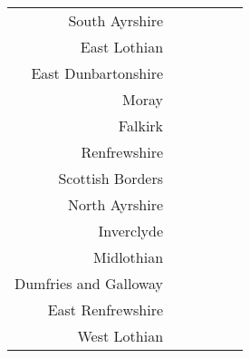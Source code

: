\documentclass[
  12pt,
]{article}
\begin{document}
\begin{longtable}[t]{rrrrrr}
South Ayrshire & \cellcolor{white}{  59.5\%} & \cellcolor{white}{  65.3\%} & \cellcolor{white}{  50.0\%} & \cellcolor{white}{  58.0\%} & \cellcolor{white}{ 116.8\%}\\
East Lothian & \cellcolor{white}{ 202.4\%} & \cellcolor{white}{ 101.1\%} & \cellcolor{white}{ 100.2\%} & \cellcolor{white}{  95.8\%} & \cellcolor{white}{  84.7\%}\\
East Dunbartonshire & \cellcolor{white}{ 185.3\%} & \cellcolor{white}{ 158.8\%} & \cellcolor{white}{  86.7\%} & \cellcolor{white}{  69.6\%} & \cellcolor{white}{ 192.3\%}\\
Moray & \cellcolor{white}{  52.5\%} & \cellcolor{white}{  64.2\%} & \cellcolor{white}{  40.1\%} & \cellcolor{white}{  54.0\%} & \cellcolor{white}{ 452.5\%}\\
Falkirk & \cellcolor{white}{  69.3\%} & \cellcolor{white}{  66.9\%} & \cellcolor{white}{  61.2\%} & \cellcolor{white}{  55.7\%} & \cellcolor{white}{ 151.2\%}\\
Renfrewshire & \cellcolor{white}{  27.5\%} & \cellcolor{white}{  41.5\%} & \cellcolor{white}{  53.3\%} & \cellcolor{white}{  50.2\%} & \cellcolor{white}{ 183.4\%}\\
Scottish Borders & \cellcolor{white}{ 224.1\%} & \cellcolor{white}{ 234.5\%} & \cellcolor{white}{ 179.0\%} & \cellcolor{white}{ 336.2\%} & \cellcolor{white}{ 604.5\%}\\
North Ayrshire & \cellcolor{white}{ 172.3\%} & \cellcolor{white}{ 236.2\%} & \cellcolor{white}{ 204.6\%} & \cellcolor{white}{ 238.2\%} & \cellcolor{white}{ 381.9\%}\\
Inverclyde & \cellcolor{white}{  89.9\%} & \cellcolor{white}{ 100.3\%} & \cellcolor{white}{  91.3\%} & \cellcolor{white}{  95.1\%} & \cellcolor{white}{ 426.2\%}\\
Midlothian & \cellcolor{white}{} & \cellcolor{white}{} & \cellcolor{white}{ 184.5\%} & \cellcolor{white}{ 138.4\%} & \cellcolor{white}{ 189.1\%}\\
Dumfries and Galloway & \cellcolor{white}{1400.0\%} & \cellcolor{white}{1252.9\%} & \cellcolor{white}{1818.2\%} & \cellcolor{white}{2500.0\%} & \cellcolor{white}{}\\
East Renfrewshire & \cellcolor{white}{ 159.7\%} & \cellcolor{white}{ 174.1\%} & \cellcolor{white}{ 181.6\%} & \cellcolor{white}{ 267.5\%} & \cellcolor{white}{1256.2\%}\\
West Lothian & \cellcolor{white}{} & \cellcolor{white}{} & \cellcolor{white}{} & \cellcolor{white}{} & \cellcolor{white}{}\\

\end{longtable}
\end{document}
